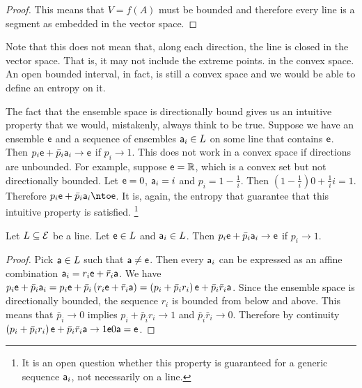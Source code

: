 \begin{mathSection}
\begin{proof}
	This means that $V = f(A)$ must be bounded and therefore every line is a segment as embedded in the vector space.
\end{proof}

\begin{remark}
	Note that this does not mean that, along each direction, the line is closed in the vector space. That is, it may not include the extreme points. in the convex space. An open bounded interval, in fact, is still a convex space and we would be able to define an entropy on it.
\end{remark}
\end{mathSection}

The fact that the ensemble space is directionally bound gives us an intuitive property that we would, mistakenly, always think to be true. Suppose we have an ensemble $\ens$ and a sequence of ensembles $\ens[a]_i \in L$ on some line that contains $\ens$. Then $p_i \ens + \bar{p}_i \ens[a]_i \to \ens$ if $p_i \to 1$. This does not work in a convex space if directions are unbounded. For example, suppose $\ens = \mathbb{R}$, which is a convex set but not directionally bounded. Let $\ens = 0$, $\ens[a]_i = i$ and $p_i = 1 - \frac{1}{i}$. Then $\left(1 - \frac{1}{i}\right) 0 + \frac{1}{i}{i} = 1$. Therefore $p_i \ens + \bar{p}_i \ens[a]_i \nto \ens$. It is, again, the entropy that guarantee that this intuitive property is satisfied. \footnote{It is an open question whether this property is guaranteed for a generic sequence $\ens[a]_i$, not necessarily on a line.}

\begin{mathSection}
	\begin{prop}
		Let $L \subseteq \Ens$ be a line. Let $\ens \in L$ and $\ens[a]_i \in L$. Then $p_i \ens + \bar{p}_i \ens[a]_i \to \ens$ if $p_i \to 1$.
	\end{prop}
	
	\begin{proof}
		Pick $\ens[a] \in L$ such that $\ens[a] \neq \ens$. Then every $\ens[a]_i$ can be expressed as an affine combination $\ens[a]_i = r_i \ens + \bar{r}_i \ens[a]$. We have $p_i \ens + \bar{p}_i \ens[a]_i = p_i \ens + \bar{p}_i \left( r_i \ens + \bar{r}_i \ens[a] \right) = \left( p_i + \bar{p}_i r_i \right) \ens + \bar{p}_i\bar{r}_i \ens[a]$. Since the ensemble space is directionally bounded, the sequence $r_i$ is bounded from below and above. This means that $\bar{p}_i \to 0$ implies $p_i + \bar{p}_i r_i \to 1$ and $\bar{p}_i\bar{r}_i \to 0$. Therefore by continuity $\left( p_i + \bar{p}_i r_i \right) \ens + \bar{p}_i\bar{r}_i \ens[a] \to 1 \ens 0 \ens[a] = \ens$.
	\end{proof}
\end{mathSection}


